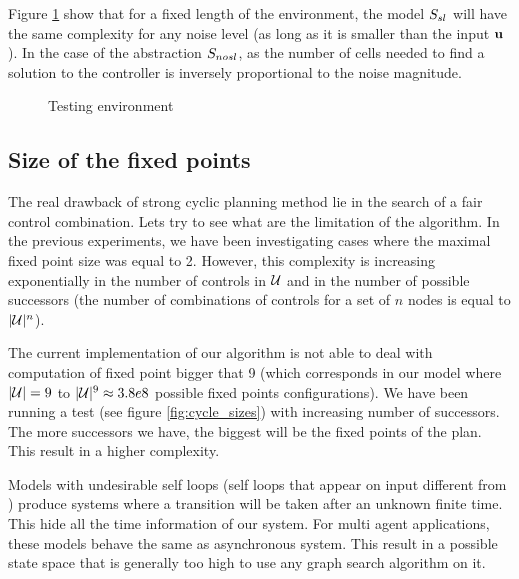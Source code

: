 Figure \ref{fig:simple_int_sl} show that for a fixed length of the environment, the model $S_{sl}$ will have the same complexity for any noise level (as long as it is smaller than the input $ \mathbf{u}$).
In the case of the abstraction $S_{nosl}$, as the number of cells needed to find a solution to the controller is inversely proportional to the noise magnitude.

\begin{figure}
	
	\caption{Testing environment}
	\label{fig:simple_int_sl}
\end{figure}

\subsection{Size of the fixed points}
%
The real drawback of strong cyclic planning method lie in the search of a fair control combination. Lets try to see what are the limitation of the algorithm.
In the previous experiments, we have been investigating cases where the maximal fixed point size was equal to 2. However, this complexity is increasing exponentially in the number of controls in $\mathcal{U}$ and in the number of possible successors (the number of combinations of controls for a set of $n$ nodes is equal to $|\mathcal{U}|^n$).

The current implementation of our algorithm is not able to deal with computation of fixed point bigger that 9 (which corresponds in our model where $|\mathcal{U}|= 9$ to $|\mathcal{U}|^9 \approx 3.8e8$ possible fixed points configurations).
We have been running a test (see figure \ref{fig:cycle_sizes}) with increasing number of successors. 
The more successors we have, the biggest will be the fixed points of the plan. This result in a higher complexity.

Models with undesirable self loops (self loops that appear on input different from \uo) produce systems where a transition will be taken after an unknown finite time.
This hide all the time information of our system.
For multi agent applications, these models behave the same as asynchronous system.
This result in a possible state space that is generally too high to use any graph search algorithm on it.

